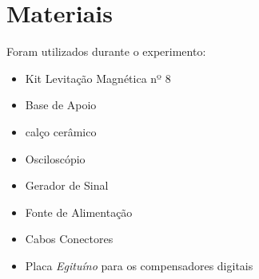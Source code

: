 \section{Materiais}
Foram utilizados durante o experimento:

\begin{itemize}
	\item Kit Levitação Magnética nº 8
	\item Base de Apoio
	\item calço cerâmico
    \item Osciloscópio
    \item Gerador de Sinal
    \item Fonte de Alimentação
    \item Cabos Conectores
    \item Placa \emph{Egituíno} para os compensadores digitais
\end{itemize}
